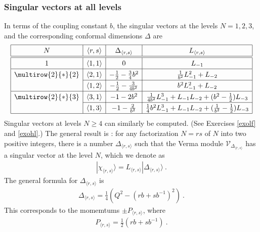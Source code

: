 \documentclass[12pt, a4paper, notitlepage, twoside]{report}
\numberwithin{equation}{section}
\theoremstyle{break}
\begin{document}
\subsubsection{Singular vectors at all levels}

In terms of the coupling constant $b$, the singular vectors at the levels $N=1,2,3$, and the corresponding conformal dimensions $\Delta$ are 
\begin{align}
\renewcommand{\arraystretch}{1.3}
\begin{array}{|c|c|c|c|}
\hline 
N & \langle r,s\rangle & \Delta_{\langle r,s\rangle} & L_{\langle r,s\rangle} 
\\
\hline\hline
1 & \langle 1,1\rangle & 0  & L_{-1}
\\
\hline
\multirow{2}{*}{2} & 
\langle 2,1\rangle & -\frac12 -\frac{3}{4} b^2  & \frac{1}{b^2}L_{-1}^2 + L_{-2}
\\
\cline{2-4}
& \langle 1,2\rangle & -\frac12 - \frac{3}{4b^2}  & b^2L_{-1}^2 + L_{-2} 
\\
\hline
\multirow{2}{*}{3} &
\langle 3,1 \rangle &  -1 -2 b^2  & \frac{1}{4b^2}L_{-1}^3 + L_{-1}L_{-2}+(b^2-\frac12)L_{-3}
\\
\cline{2-4}
& \langle 1,3 \rangle &  -1 - \frac{2}{b^2}  & \frac14 b^2L_{-1}^3 + L_{-1}L_{-2} + (\frac{1}{b^2}-\frac12)L_{-3}
\\
\hline
\end{array}
\label{lot}
\end{align}
Singular vectors at levels $N\geq 4$ can similarly be computed. (See Exercises \ref{exolf} and \ref{exohl}.) The general result is \cite{fms97}: for any factorization $N=rs$ of $N$ into two positive integers, there is a number $\Delta_{\langle r,s \rangle}$ such that the Verma module $\mathcal{V}_{\Delta_{\langle r,s \rangle}}$ has a singular vector at the level $N$, which we denote as
\begin{align}
 |\chi_{\langle r,s \rangle}\rangle = L_{\langle r,s \rangle} |\Delta_{\langle r,s \rangle}\rangle\ .
\label{lrs}
\end{align}
The general formula for $\Delta_{\langle r,s \rangle}$ is
\begin{align}
 \Delta_{\langle r,s \rangle} = \frac14\left(Q^2-(rb+sb^{-1})^2\right)\ .
\label{drs}
\end{align}
This corresponds to the momemtums $\pm P_{\langle r,s \rangle}$, where
\begin{align}
 \boxed{P_{\langle r,s \rangle} = \frac12\left(rb + sb^{-1}\right) }\ . 
\label{ars}
\end{align}
\end{document}
